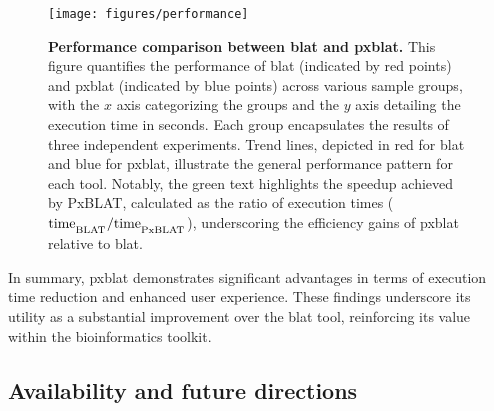 \documentclass[10pt,letterpaper]{article}
\begin{document}
\begin{figure}[!h]
	\caption{{\bf Performance comparison between \gls{blat} and \gls{pxblat}.} This figure quantifies the performance of \gls{blat} (indicated by red points) and \gls{pxblat} (indicated by blue points) across various sample groups, with the \(x\) axis categorizing the groups and the \(y\) axis detailing the execution time in seconds.
        Each group encapsulates the results of three independent experiments.
        Trend lines, depicted in red for \gls{blat} and blue for \gls{pxblat}, illustrate the general performance pattern for each tool.
        Notably, the green text highlights the speedup achieved by PxBLAT, calculated as the ratio of execution times (\(\mathrm{time}_\textsubscript{BLAT} / \mathrm{time}_\textsubscript{PxBLAT}\)), underscoring the efficiency gains of \gls{pxblat} relative to \gls{blat}.}
	\texttt{[image: figures/performance]}
	\label{fig:performance}
\end{figure}

In summary, \gls{pxblat} demonstrates significant advantages in terms of execution time reduction and enhanced user experience.
These findings underscore its utility as a substantial improvement over the \gls{blat} tool, reinforcing its value within the bioinformatics toolkit.

\subsection*{Availability and future directions}
\end{document}
